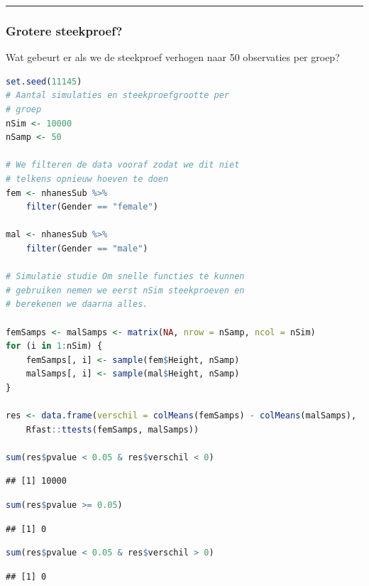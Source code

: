 \documentclass[
  12pt,dutch,coursenotes]{book}
\theoremstyle{definition}
\theoremstyle{definition}
\theoremstyle{definition}
\theoremstyle{definition}
\theoremstyle{remark}
\begin{document}
\begin{center}\rule{0.5\linewidth}{0.5pt}\end{center}

\hypertarget{grotere-steekproef}{%
\subsubsection{Grotere steekproef?}\label{grotere-steekproef}}

Wat gebeurt er als we de steekproef verhogen naar 50 observaties per groep?

\begin{lstlisting}[language=R]
set.seed(11145)
# Aantal simulaties en steekproefgrootte per
# groep
nSim <- 10000
nSamp <- 50

# We filteren de data vooraf zodat we dit niet
# telkens opnieuw hoeven te doen
fem <- nhanesSub %>%
    filter(Gender == "female")

mal <- nhanesSub %>%
    filter(Gender == "male")

# Simulatie studie Om snelle functies te kunnen
# gebruiken nemen we eerst nSim steekproeven en
# berekenen we daarna alles.

femSamps <- malSamps <- matrix(NA, nrow = nSamp, ncol = nSim)
for (i in 1:nSim) {
    femSamps[, i] <- sample(fem$Height, nSamp)
    malSamps[, i] <- sample(mal$Height, nSamp)
}

res <- data.frame(verschil = colMeans(femSamps) - colMeans(malSamps),
    Rfast::ttests(femSamps, malSamps))

sum(res$pvalue < 0.05 & res$verschil < 0)
\end{lstlisting}

\begin{lstlisting}
## [1] 10000
\end{lstlisting}

\begin{lstlisting}[language=R]
sum(res$pvalue >= 0.05)
\end{lstlisting}

\begin{lstlisting}
## [1] 0
\end{lstlisting}

\begin{lstlisting}[language=R]
sum(res$pvalue < 0.05 & res$verschil > 0)
\end{lstlisting}

\begin{lstlisting}
## [1] 0
\end{lstlisting}
\end{document}
